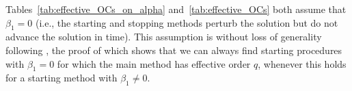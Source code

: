 
Tables~\ref{tab:effective_OCs_on_alpha} and~\ref{tab:effective_OCs}
both assume that $\beta_1=0$ (i.e., the starting and stopping methods
perturb the solution but do not advance the solution in time).  This
assumption is without loss of generality following \cite[Lemma
389A]{Butcher2008_book}, the proof of which shows that we can always find 
starting procedures with $\beta_1 = 0$ for which the main method has 
effective order $q$, whenever this holds for a starting method with 
$\beta_1 \neq 0$.




